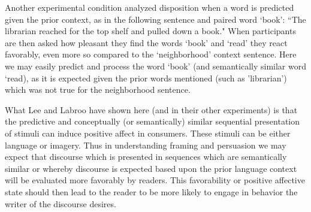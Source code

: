 \documentclass[11pt,a4paper]{article}
\begin{document}
Another experimental condition analyzed disposition when a word is predicted given the prior context, as in the following sentence and paired word `book': ``The librarian reached for the top shelf and pulled down a book."  When participants are then asked how pleasant they find the words `book' and `read' they react favorably, even more so compared to the `neighborhood' context sentence. Here we may easily predict and process the word `book' (and semantically similar word `read), as it is expected given the prior words mentioned (such as 'librarian') which was not true for the neighborhood sentence. 




What Lee and Labroo have shown here (and in their other experiments) is that the predictive and conceptually (or semantically) similar sequential presentation of stimuli can induce positive affect in consumers. These stimuli can be either language or imagery. Thus in understanding framing and persuasion we may expect that discourse which is presented in sequences which are semantically similar or whereby discourse is expected based upon the prior language context will be evaluated more favorably by readers. This favorability or positive affective state should then lead to the reader to be more likely to engage in behavior the writer of the discourse desires. %








\end{document}
